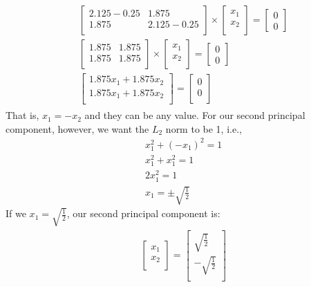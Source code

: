 \documentclass[leqno]{article}
\begin{document}
\begin{gather*}
\begin{split}
&\begin{bmatrix}
    2.125 - 0.25 & 1.875 \\
    1.875 & 2.125 - 0.25\\  
\end{bmatrix} \times \begin{bmatrix}
   x_1\\
   x_2\\
\end{bmatrix} =
\begin{bmatrix}
   0\\
   0
\end{bmatrix}
\\
&\begin{bmatrix}
    1.875 & 1.875 \\
    1.875 & 1.875\\  
\end{bmatrix} \times \begin{bmatrix}
   x_1\\
   x_2\\
\end{bmatrix} =
\begin{bmatrix}
   0\\
   0
\end{bmatrix}
\\
&\begin{bmatrix}
    1.875x_1 + 1.875x_2 \\
    1.875x_1 + 1.875x_2\\  
\end{bmatrix} =
\begin{bmatrix}
   0\\
   0\\
\end{bmatrix}
\end{split}
\end{gather*}
That is, $x_1 = -x_2$ and they can be any value. For our second principal component, however, we want the $L_2$ norm to be 1, i.e., 
\begin{equation*}
\begin{split}
&x_1^2 + (-x_1)^2 = 1\\
&x_1^2 + x_1^2 = 1\\
&2x_1^2 = 1\\
&x_1 = \pm \sqrt{\frac{1}{2}}  
\end{split}
\end{equation*}
If we $x_1 = \sqrt{\frac{1}{2}}$, our second principal component is:
\begin{gather*}
\begin{split}
&\begin{bmatrix}
    x_1 \\
    x_2  \\
\end{bmatrix} =
\begin{bmatrix} 
   \sqrt{\frac{1}{2}}\\
   -\sqrt{\frac{1}{2}}\\
\end{bmatrix}
\end{split}
\end{gather*}
\end{document}
